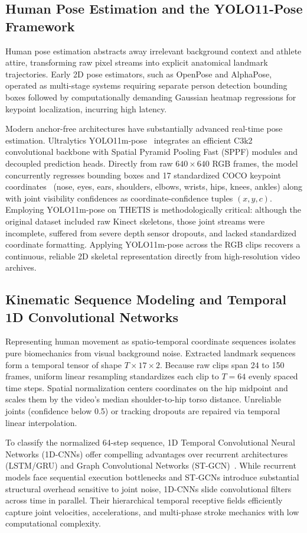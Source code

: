 \documentclass[12pt,a4paper]{article}
\begin{document}
\subsection{Human Pose Estimation and the YOLO11-Pose Framework}
Human pose estimation abstracts away irrelevant background context and athlete attire, transforming raw pixel streams into explicit anatomical landmark trajectories. Early 2D pose estimators, such as OpenPose and AlphaPose, operated as multi-stage systems requiring separate person detection bounding boxes followed by computationally demanding Gaussian heatmap regressions for keypoint localization, incurring high latency.

Modern anchor-free architectures have substantially advanced real-time pose estimation. Ultralytics YOLO11m-pose~\cite{jocher2024yolo11} integrates an efficient C3k2 convolutional backbone with Spatial Pyramid Pooling Fast (SPPF) modules and decoupled prediction heads. Directly from raw $640 \times 640$ RGB frames, the model concurrently regresses bounding boxes and 17 standardized COCO keypoint coordinates~\cite{lin2014microsoft} (nose, eyes, ears, shoulders, elbows, wrists, hips, knees, ankles) along with joint visibility confidences as coordinate-confidence tuples $(x, y, c)$. Employing YOLO11m-pose on THETIS is methodologically critical: although the original dataset included raw Kinect skeletons, those joint streams were incomplete, suffered from severe depth sensor dropouts, and lacked standardized coordinate formatting. Applying YOLO11m-pose across the RGB clips recovers a continuous, reliable 2D skeletal representation directly from high-resolution video archives.
\clearpage
\subsection{Kinematic Sequence Modeling and Temporal 1D Convolutional Networks}
Representing human movement as spatio-temporal coordinate sequences isolates pure biomechanics from visual background noise. Extracted landmark sequences form a temporal tensor of shape $T \times 17 \times 2$. Because raw clips span 24 to 150 frames, uniform linear resampling standardizes each clip to $T = 64$ evenly spaced time steps. Spatial normalization centers coordinates on the hip midpoint and scales them by the video's median shoulder-to-hip torso distance. Unreliable joints (confidence below 0.5) or tracking dropouts are repaired via temporal linear interpolation.

To classify the normalized 64-step sequence, 1D Temporal Convolutional Neural Networks (1D-CNNs) offer compelling advantages over recurrent architectures (LSTM/GRU) and Graph Convolutional Networks (ST-GCN)~\cite{yan2018spatial}. While recurrent models face sequential execution bottlenecks and ST-GCNs introduce substantial structural overhead sensitive to joint noise, 1D-CNNs slide convolutional filters across time in parallel. Their hierarchical temporal receptive fields efficiently capture joint velocities, accelerations, and multi-phase stroke mechanics with low computational complexity.
\end{document}
